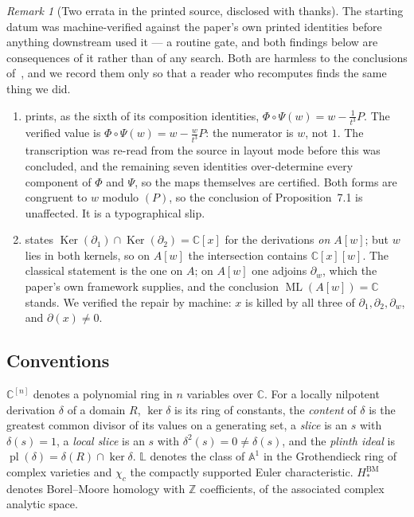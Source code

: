 \documentclass[11pt]{article}
\theoremstyle{definition}
\theoremstyle{remark}
\newtheorem{remark}[theorem]{Remark}
\newcommand{\C}{\mathbb{C}}
\newcommand{\Z}{\mathbb{Z}}
\newcommand{\Aff}[1]{\mathbb{A}^{#1}}
\newcommand{\Lef}{\mathbb{L}}
\newcommand{\HBM}[1]{H^{\mathrm{BM}}_{#1}}
\newcommand{\ML}{\operatorname{ML}}
\newcommand{\pl}{\operatorname{pl}}
\newcommand{\Ker}{\operatorname{Ker}}
\newcommand{\chic}{\chi_c}
\begin{document}
\begin{remark}[Two errata in the printed source, disclosed with
thanks]\label{rem:errata}
The starting datum was machine-verified against the paper's own printed
identities before anything downstream used it --- a routine gate, and both
findings below are consequences of it rather than of any search. Both are
harmless to the conclusions of~\cite{DMJP2009}, and we record them only so
that a reader who recomputes finds the same thing we did.
\begin{enumerate}
\item[(i)] \cite[Prop.~7.1]{DMJP2009} prints, as the sixth of its composition
identities, $\Phi\circ\Psi(w)=w-\tfrac{1}{t^3}P$. The verified value is
$\Phi\circ\Psi(w)=w-\tfrac{w}{t^3}P$: the numerator is $w$, not $1$. The
transcription was re-read from the source in layout mode before this was
concluded, and the remaining seven identities over-determine every component
of $\Phi$ and $\Psi$, so the maps themselves are certified. Both forms are
congruent to $w$ modulo $(P)$, so the conclusion of Proposition~7.1 is
unaffected. It is a typographical slip.
\item[(ii)] \cite[Cor.~7.3]{DMJP2009} states $\Ker(\partial_1)\cap
\Ker(\partial_2)=\C[x]$ for the derivations \emph{on $A[w]$}; but $w$ lies in
both kernels, so on $A[w]$ the intersection contains $\C[x][w]$. The classical
statement is the one on $A$; on $A[w]$ one adjoins $\partial_w$, which the
paper's own framework supplies, and the conclusion $\ML(A[w])=\C$ stands. We
verified the repair by machine: $x$ is killed by all three of
$\partial_1,\partial_2,\partial_w$, and $\partial(x)\ne0$.
\end{enumerate}
\end{remark}

\subsection{Conventions}

$\C^{[n]}$ denotes a polynomial ring in $n$ variables over $\C$. For a locally
nilpotent derivation $\delta$ of a domain $R$, $\ker\delta$ is its ring of
constants, the \emph{content} of $\delta$ is the greatest common divisor of
its values on a generating set, a \emph{slice} is an $s$ with $\delta(s)=1$, a
\emph{local slice} is an $s$ with $\delta^2(s)=0\ne\delta(s)$, and the
\emph{plinth ideal} is $\pl(\delta)=\delta(R)\cap\ker\delta$. $\Lef$ denotes
the class of $\Aff{1}$ in the Grothendieck ring of complex varieties and
$\chic$ the compactly supported Euler characteristic. $\HBM{\ast}$ denotes
Borel--Moore homology with $\Z$ coefficients, of the associated complex
analytic space.
\end{document}
